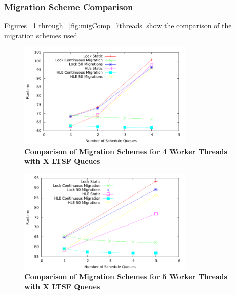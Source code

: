 \documentclass[11pt]{book}
\begin{document}
\subsubsection{Migration Scheme Comparison}

Figures ~\ref{fig:migComp_4threads} through ~\ref{fig:migComp_7threads} show the comparison of the migration schemes
used.

\begin{figure}[H]
    \centering
    \graphicspath{ {./figures/} }
    \includegraphics[width=0.75\textwidth,keepaspectratio]{migComp_4threads}
    \caption{\textbf{Comparison of Migration Schemes for 4 Worker Threads with X
    LTSF Queues}}
    \label{fig:migComp_4threads}
\end{figure}

\begin{figure}[H]
    \centering
    \graphicspath{ {./figures/} }
    \includegraphics[width=0.75\textwidth,keepaspectratio]{migComp_5threads}
    \caption{\textbf{Comparison of Migration Schemes for 5 Worker Threads with X
    LTSF Queues}}
    \label{fig:migComp_5threads}
\end{figure}
\end{document}
